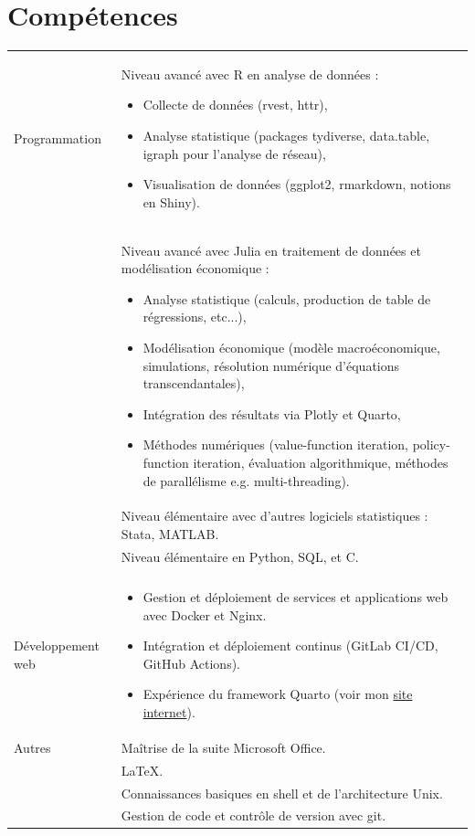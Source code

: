 \documentclass[a4paper,12pt]{article}
\begin{document}
\section{Compétences}
\begin{tabularx}{\linewidth}{@{}l X@{}}
Programmation 
& Niveau avancé avec R en analyse de données :
\begin{itemize}
\item Collecte de données (rvest, httr),
\item Analyse statistique (packages tydiverse, data.table, igraph pour l'analyse de réseau),
\item Visualisation de données (ggplot2, rmarkdown, notions en Shiny).
\end{itemize} \\
& Niveau avancé avec Julia en traitement de données et modélisation économique : 
\begin{itemize}
\item Analyse statistique (calculs, production de table de régressions, etc...),
\item Modélisation économique (modèle macroéconomique, simulations, résolution numérique d'équations transcendantales), 
\item Intégration des résultats via Plotly et Quarto,
\item Méthodes numériques (value-function iteration, policy-function iteration, évaluation algorithmique, méthodes de parallélisme e.g. multi-threading).
\end{itemize}\\
& Niveau élémentaire avec d'autres logiciels statistiques : Stata, MATLAB. \\
& Niveau élémentaire en Python, SQL, et C. \\
& \\
Développement web &  
\begin{itemize}
    \item Gestion et déploiement de services et applications web avec Docker et Nginx.
    \item Intégration et déploiement continus (GitLab CI/CD, GitHub Actions).
    \item Expérience du framework Quarto (voir mon \href{https://www.paulogcd.com}{site internet}).
\end{itemize} \\ 
Autres & Maîtrise de la suite Microsoft Office. \\
&  \LaTeX. \\
& Connaissances basiques en shell et de l'architecture Unix. \\
& Gestion de code et contrôle de version avec git.\\
\end{tabularx}
\end{document}
